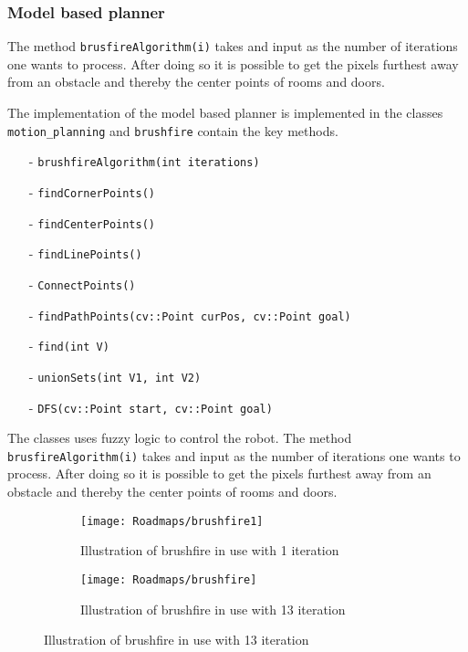 \documentclass[../Head/Main.tex]{subfiles}
\begin{document}
\subsubsection{Model based planner}
\label{subsubsec:modelBasedImplementation}
The method \texttt{brusfireAlgorithm(i)} takes and input as the number of iterations one wants to process. After doing so it is possible to get the pixels furthest away from an obstacle and thereby the center points of rooms and doors.   

The implementation of the model based planner is implemented in the classes \texttt{motion\_planning} and \texttt{brushfire} contain the key methods.
\begin{itemize}
	\item[-] \texttt{brushfireAlgorithm(int iterations)} \vspace{-5pt}
	\item[-] \texttt{findCornerPoints()} \vspace{-5pt}
	\item[-] \texttt{findCenterPoints()} \vspace{-5pt}
	\item[-] \texttt{findLinePoints()} \vspace{-5pt}
	\item[-] \texttt{ConnectPoints()} \vspace{-5pt}
	\item[-] \texttt{findPathPoints(cv::Point curPos, cv::Point goal)} \vspace{-5pt}
	\item[-] \texttt{find(int V)} \vspace{-5pt}
	\item[-] \texttt{unionSets(int V1, int V2)} \vspace{-5pt}
	\item[-] \texttt{DFS(cv::Point start, cv::Point goal)} 
\end{itemize}
The classes uses fuzzy logic to control the robot. The method \texttt{brusfireAlgorithm(i)} takes and input as the number of iterations one wants to process. After doing so it is possible to get the pixels furthest away from an obstacle and thereby the center points of rooms and doors.   
\begin{figure}[H]
  \begin{subfigure}[b]{0.49\textwidth}
    \centering
    \texttt{[image: Roadmaps/brushfire1]}
    \caption{Illustration of brushfire in use with 1 iteration}
    \label{fig:Brushfire1}
  \end{subfigure}
  \hfill
   \begin{subfigure}[b]{0.49\textwidth}
    \centering
    \texttt{[image: Roadmaps/brushfire]}
    \caption{Illustration of brushfire in use with 13 iteration}
    \label{fig:Brusfire2}
  \end{subfigure}
  \end{figure}
  
\end{document}

